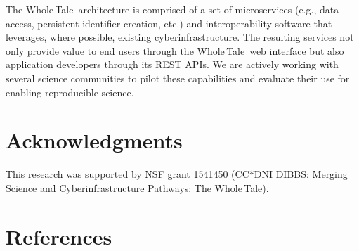 \documentclass[review]{elsarticle}
\newcommand{\wt}{Whole\,Tale}
\begin{document}
The \wt\ architecture is comprised of a set
of microservices (e.g., data
access, persistent identifier creation, etc.) and
interoperability software that leverages, where possible, 
existing cyberinfrastructure. The resulting services
not only provide value to end users through the \wt\ 
 web interface but also application developers through
its REST APIs. 
We are actively working with several science communities
to pilot these capabilities and evaluate their use for
enabling reproducible science.

\section*{Acknowledgments}
This research was supported by NSF grant
1541450 (CC*DNI DIBBS: Merging Science and Cyberinfrastructure Pathways: The \wt).

\section*{References}


\end{document}
